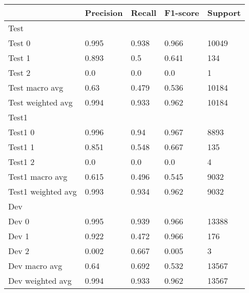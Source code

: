 \begin{tabular}{lllll}
\toprule
{} & Precision & Recall & F1-score & Support \\
\midrule
Test               &           &        &          &         \\
Test 0             &     0.995 &  0.938 &    0.966 &   10049 \\
Test 1             &     0.893 &    0.5 &    0.641 &     134 \\
Test 2             &       0.0 &    0.0 &      0.0 &       1 \\
Test macro avg     &      0.63 &  0.479 &    0.536 &   10184 \\
Test weighted avg  &     0.994 &  0.933 &    0.962 &   10184 \\
Test1              &           &        &          &         \\
Test1 0            &     0.996 &   0.94 &    0.967 &    8893 \\
Test1 1            &     0.851 &  0.548 &    0.667 &     135 \\
Test1 2            &       0.0 &    0.0 &      0.0 &       4 \\
Test1 macro avg    &     0.615 &  0.496 &    0.545 &    9032 \\
Test1 weighted avg &     0.993 &  0.934 &    0.962 &    9032 \\
Dev                &           &        &          &         \\
Dev 0              &     0.995 &  0.939 &    0.966 &   13388 \\
Dev 1              &     0.922 &  0.472 &    0.966 &     176 \\
Dev 2              &     0.002 &  0.667 &    0.005 &       3 \\
Dev macro avg      &      0.64 &  0.692 &    0.532 &   13567 \\
Dev weighted avg   &     0.994 &  0.933 &    0.962 &   13567 \\
\bottomrule
\end{tabular}
